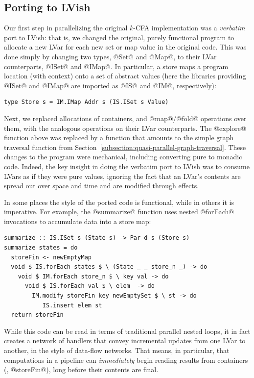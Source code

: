\subsection{Porting to LVish}

Our first step in parallelizing the original $k$-CFA implementation
was a \emph{verbatim} port to LVish: that is, we changed the original,
purely functional program to allocate a new LVar for each new set or
map value in the original code.  This was done simply by changing two
types, @Set@ and @Map@, to their LVar counterparts, @ISet@ and @IMap@.
In particular, a store maps a program location (with context) onto a
set of abstract values (here the libraries providing @ISet@ and @IMap@
are imported as @IS@ and @IM@, respectively):

\singlespacing
\begin{lstlisting}
type Store s = IM.IMap Addr s (IS.ISet s Value)
\end{lstlisting}
\doublespacing

Next, we replaced allocations of containers, and @map@/@fold@
operations over them, with the analogous operations on their LVar
counterparts.  The @explore@ function above was replaced by a function
that amounts to the simple graph traversal function from
Section~\ref{subsection:quasi-parallel-graph-traversal}.  These
changes to the program were mechanical, including converting pure to
monadic code.  Indeed, the key insight in doing the verbatim port to
LVish was to consume LVars as if they were pure values, ignoring the
fact that an LVar's contents are spread out over space and time and
are modified through effects.

In some places the style of the ported code is functional, while in
others it is imperative.  For example, the @summarize@ function uses
nested @forEach@ invocations to accumulate data into a store map:

\singlespacing
\begin{lstlisting}
summarize :: IS.ISet s (State s) -> Par d s (Store s)
summarize states = do
  storeFin <- newEmptyMap
  void $ IS.forEach states $ \ (State _ _ store_n _) -> do 
    void $ IM.forEach store_n $ \ key val -> do
      void $ IS.forEach val $ \ elem  -> do
        IM.modify storeFin key newEmptySet $ \ st -> do
           IS.insert elem st
  return storeFin
\end{lstlisting}
\doublespacing

While this code can be read in terms of traditional parallel nested
loops, it in fact creates a network of handlers that convey
incremental updates from one LVar to another, in the style of
data-flow networks.  That means, in particular, that computations in a
pipeline can \emph{immediately} begin reading results from containers
(\eg, @storeFin@), long before their contents are final.


